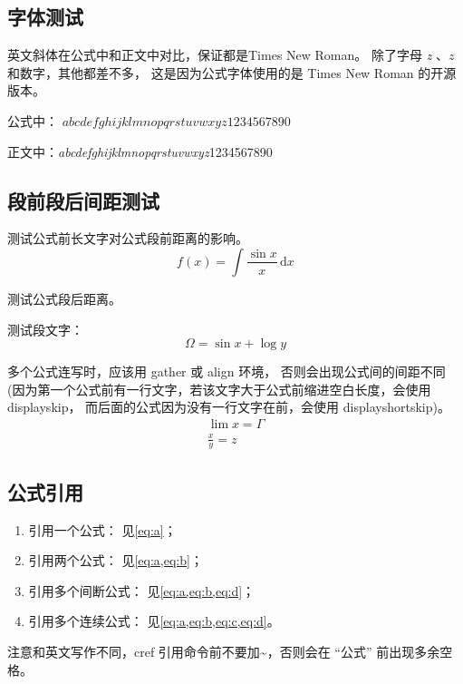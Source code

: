 \subsection{字体测试}

英文斜体在公式中和正文中对比，保证都是Times New Roman。
除了字母 \textit{z} 、$z$和数字，其他都差不多，
这是因为公式字体使用的是 Times New Roman 的开源版本。

公式中： $abcdefghijklmnopqrstuvwxyz1234567890$

正文中：\textit{abcdefghijklmnopqrstuvwxyz}1234567890

\subsection{段前段后间距测试}

测试公式前长文字对公式段前距离的影响。
%
\begin{equation}  \label{eq:a}
	f(x) = \int\frac{\sin x}{x}\,\mathrm{d}x
\end{equation}

测试公式段后距离。

测试段文字：
%
\begin{equation}	\label{eq:b}
	\Omega = \sin x + \log y
\end{equation}

多个公式连写时，应该用 gather 或 align 环境， 否则会出现公式间的间距不同
(因为第一个公式前有一行文字，若该文字大于公式前缩进空白长度，会使用 displayskip，
而后面的公式因为没有一行文字在前，会使用 displayshortskip)。
%
\begin{gather}
	\lim x = \Gamma	\label{eq:c} \\
	\frac{x}{y} = z	\label{eq:d}
\end{gather}

\subsection{公式引用}

\begin{enumerate}
	\item 引用一个公式： 见\cref{eq:a}；
	\item 引用两个公式： 见\cref{eq:a,eq:b}；
	\item 引用多个间断公式： 见\cref{eq:a,eq:b,eq:d}；
	\item 引用多个连续公式： 见\cref{eq:a,eq:b,eq:c,eq:d}。
\end{enumerate}

注意和英文写作不同，cref 引用命令前不要加\~{}，否则会在 ``公式'' 前出现多余空格。


